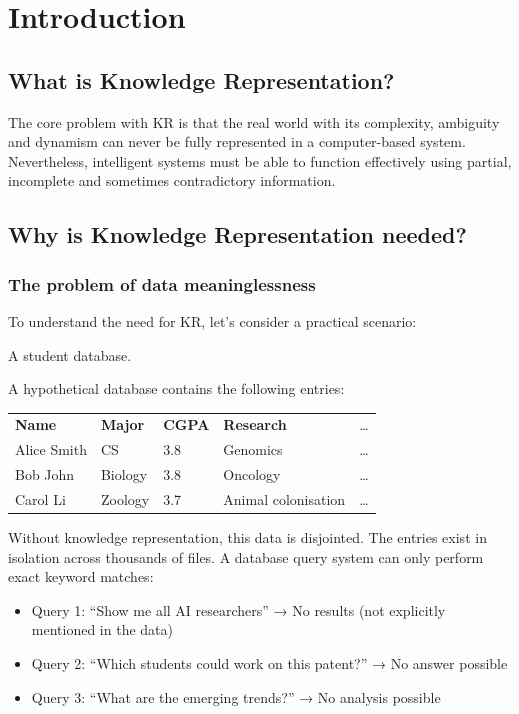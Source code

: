 \section{Introduction}\label{sec:introduction}

\subsection*{What is Knowledge Representation?}

The core problem with KR is that the real world with its complexity, ambiguity and dynamism can never be fully represented in a computer-based system.
Nevertheless, intelligent systems must be able to function effectively using partial, incomplete and sometimes contradictory information.
\cite{folien1}

\subsection*{Why is Knowledge Representation needed?}

\subsubsection*{The problem of data meaninglessness}
To understand the need for KR, let’s consider a practical scenario:
\begin{bsp}

    A student database.

    A hypothetical database contains the following entries:

    \begin{table}[H]
        \centering
        \begin{tabular}{lllll}
            \textbf{Name} & \textbf{Major} & \textbf{CGPA} & \textbf{Research}   & \ldots \\
            Alice Smith   & CS             & 3.8           & Genomics            & \ldots \\
            Bob John      & Biology        & 3.8           & Oncology            & \ldots \\
            Carol Li      & Zoology        & 3.7           & Animal colonisation & \ldots
        \end{tabular}
        \label{tab:first-example}
    \end{table}

    Without knowledge representation, this data is disjointed.
    The entries exist in isolation across thousands of files.
    A database query system can only perform exact keyword matches:

    \begin{itemize}
        \item Query 1: ``Show me all AI researchers'' → No results (not explicitly mentioned in the data)
        \item Query 2: ``Which students could work on this patent?'' → No answer possible
        \item Query 3: ``What are the emerging trends?'' → No analysis possible
    \end{itemize}

\end{bsp}

